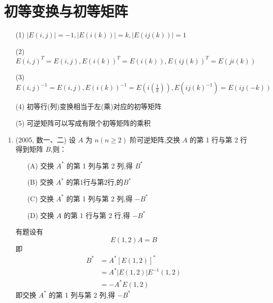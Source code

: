 \documentclass[12pt, a4paper, oneside, UTF8]{ctexbook}
\begin{document}
\section{初等变换与初等矩阵}
\begin{remark}[初等变换与初等矩阵的性质]
    \begin{enumerate}
    \item [(1)] $\left|E(i,j)\right|=-1,\left|E(i(k))\right|=k,\left|E(ij(k))\right|=1$
    \item [(2)] $E(i, j)^T=E(i,j),E(i(k))^T=E(i(k)),E(ij(k))^T=E(ji(k))$
    \item [(3)] $E(i,j)^{-1}=E(i,j),E(i(k))^{-1}=E(i(\frac{1}{k})),E(ij(k)^{-1})=E(ij(-k))$
    \item [(4)] 初等行(列)变换相当于左(乘)对应的初等矩阵
    \item [(5)] 可逆矩阵可以写成有限个初等矩阵的乘积
    \end{enumerate}
\end{remark}
\begin{enumerate}[label=\arabic*.,start=11]
    \item (2005, 数一、二) 设 $ A $ 为 $ n(n \geq 2) $ 阶可逆矩阵,交换 $ A $ 的第 1 行与第 2 行得到矩阵 $ B $,则：
    \begin{enumerate}
        \item [(A)] 交换 $ A^* $ 的第 1 列与第 2 列,得 $ B^* $
        \item [(B)] 交换 $ A^* $ 的第1行与第2行,的$B^*$
        \item [(C)] 交换 $ A^* $ 的第 1 列与第 2 列,得 $ -B^* $
        \item [(D)] 交换 $ A $ 的第 1 行与第 2 行,得 $ -B^* $
    \end{enumerate}
    
    \begin{solution}
    有题设有
    $$
        E(1,2)A = B 
    $$
    即
    \begin{align*}
        B^* &= A^*\left[E(1,2)\right]^* \\
        &=A^*\left|E(1,2)\right|E^{-1}(1,2) \\
        &=-A^*E(1,2)
    \end{align*}
    即交换 $ A^* $ 的第 1 列与第 2 列,得 $ -B^* $
    \end{solution}
\end{enumerate}

\ifx\allfiles\undefined
\end{document}
